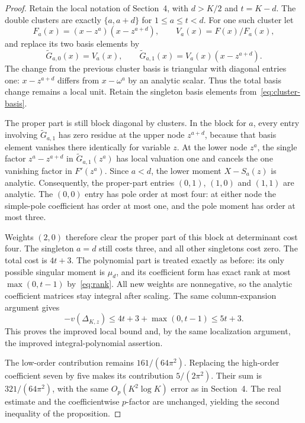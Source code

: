 \documentclass[11pt,letterpaper]{article}
\numberwithin{equation}{section}
\theoremstyle{remark}
\begin{document}
\begin{proof}
Retain the local notation of Section~4, with $d>K/2$ and $t=K-d$. The double clusters are exactly $\{a,a+d\}$ for $1\le a\le t<d$. For one such cluster let
\begin{equation*}
 F_a(x)=(x-z^a)(x-z^{a+d}),\qquad V_a(x)=F(x)/F_a(x),
\end{equation*}
and replace its two basis elements by
\begin{equation*}
 \widetilde G_{a,0}(x)=V_a(x),\qquad
 \widetilde G_{a,1}(x)=V_a(x)(x-z^{a+d}).
\end{equation*}
The change from the previous cluster basis is triangular with diagonal entries one: $x-z^{a+d}$ differs from $x-\omega^a$ by an analytic scalar. Thus the total basis change remains a local unit. Retain the singleton basis elements from~\eqref{eq:cluster-basis}.

The proper part is still block diagonal by clusters. In the block for $a$, every entry involving $\widetilde G_{a,1}$ has zero residue at the upper node $z^{a+d}$, because that basis element vanishes there identically for variable $z$. At the lower node $z^a$, the single factor $z^a-z^{a+d}$ in $\widetilde G_{a,1}(z^a)$ has local valuation one and cancels the one vanishing factor in $F'(z^a)$. Since $a<d$, the lower moment $X-S_a(z)$ is analytic. Consequently, the proper-part entries $(0,1)$, $(1,0)$ and $(1,1)$ are analytic. The $(0,0)$ entry has pole order at most four: at either node the simple-pole coefficient has order at most one, and the pole moment has order at most three.

Weights $(2,0)$ therefore clear the proper part of this block at determinant cost four. The singleton $a=d$ still costs three, and all other singletons cost zero. The total cost is $4t+3$. The polynomial part is treated exactly as before: its only possible singular moment is $\mu_d$, and its coefficient form has exact rank at most $\max(0,t-1)$ by~\eqref{eq:rank}. All new weights are nonnegative, so the analytic coefficient matrices stay integral after scaling. The same column-expansion argument gives
\begin{equation*}
 -v(\Delta_{K,z})\le4t+3+\max(0,t-1)\le5t+3.
\end{equation*}
This proves the improved local bound and, by the same localization argument, the improved integral-polynomial assertion.

The low-order contribution remains $161/(64\pi^2)$. Replacing the high-order coefficient seven by five makes its contribution $5/(2\pi^2)$. Their sum is $321/(64\pi^2)$, with the same $O_p(K^2\log K)$ error as in Section~4. The real estimate and the coefficientwise $p$-factor are unchanged, yielding the second inequality of the proposition.
\end{proof}
\end{document}
